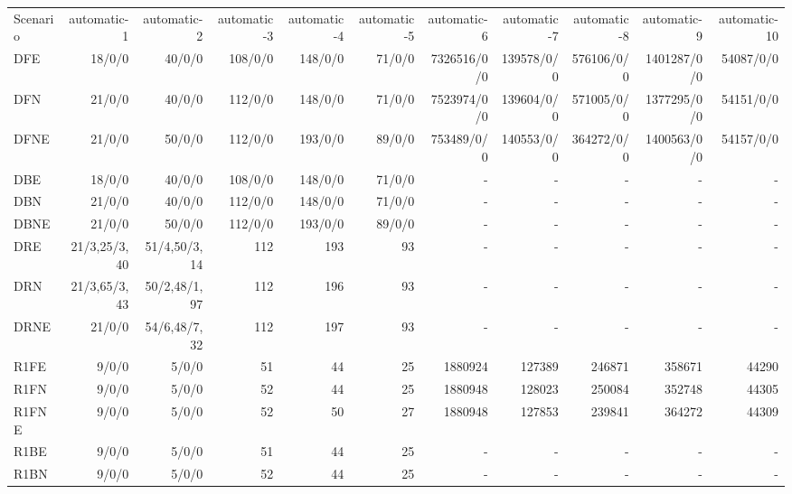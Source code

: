 \documentclass [11pt]{article}
\begin{document}
\begin{sidewaystable}
\small
  \everyrow{\hline}
  \begin{tabu} {| l |r | r |r |r |r |r |r |r |r |r |}
  Scenario    &automatic-1   & automatic-2    &automatic-3    &automatic-4    & automatic-5  & automatic-6    & automatic-7    &  automatic-8   & automatic-9   & automatic-10 \\
  DFE    & 18/0/0   & 40/0/0    & 108/0/0    & 148/0/0   &  71/0/0   &  7326516/0/0   & 139578/0/0    & 576106/0/0    &  1401287/0/0   & 54087/0/0    \\ 
  DFN    & 21/0/0   & 40/0/0    & 112/0/0    & 148/0/0   &  71/0/0   &  7523974/0/0   & 139604/0/0    & 571005/0/0    &  1377295/0/0   & 54151/0/0   \\ 
  DFNE   & 21/0/0   & 50/0/0    & 112/0/0    & 193/0/0   &  89/0/0   &   753489/0/0   & 140553/0/0    & 364272/0/0    &  1400563/0/0   & 54157/0/0    \\ 
  DBE    & 18/0/0   & 40/0/0    & 108/0/0    & 148/0/0   &  71/0/0   &  -   &   -    &   -    &    -   &   -   \\ 
  DBN    & 21/0/0   & 40/0/0    & 112/0/0    & 148/0/0   &  71/0/0   &  -   &   -    &   -    &    -   &   -   \\ 
  DBNE    & 21/0/0  & 50/0/0    & 112/0/0    & 193/0/0   &  89/0/0   &  -   &   -    &   -    &    -   &   -    \\ 
  DRE    & 21/3,25/3,40   & 51/4,50/3,14    & 112    & 193   &  93   &  -   &   -    &   -    &    -   &   -   \\ 
  DRN    & 21/3,65/3,43   & 50/2,48/1,97    & 112    & 196   &  93   &  -   &   -    &   -    &    -   &   -   \\ 
  DRNE   & 21/0/0   & 54/6,48/7,32    & 112    & 197   &  93   &  -   &   -    &   -    &    -   &   -    \\ 
  R1FE   & 9/0/0   & 5/0/0   & 51   & 44 &  25  &   1880924  & 127389   & 246871   &  358671  & 44290 \\ 
  R1FN    & 9/0/0  & 5/0/0   & 52   & 44 &  25  &   1880948  & 128023   & 250084   &  352748  & 44305   \\ 
  R1FNE    &9/0/0   &5/0/0    &52    &50  & 27   & 1880948   &127853    &239841    & 364272   &44309    \\ 
  R1BE    & 9/0/0  & 5/0/0   & 51   & 44 &  25  &  -   &   -    &   -    &    -   &   -    \\ 
  R1BN    & 9/0/0  & 5/0/0   & 52   & 44 &  25  &  -   &   -    &   -    &    -   &   -    \\ 

\end{tabu}
\end{sidewaystable}
\end{document}
